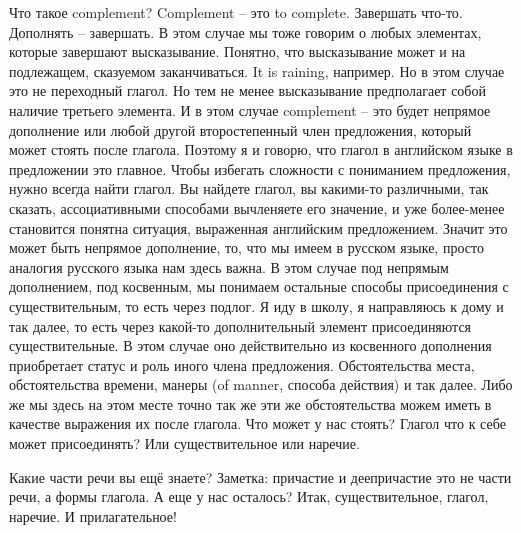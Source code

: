 \documentclass[main.tex]{subfiles}
\begin{document}
Что такое complement?
Complement -- это to complete.
Завершать что-то.
Дополнять -- завершать.
В этом случае мы тоже говорим о любых элементах, которые завершают высказывание.
Понятно, что высказывание может и на подлежащем, сказуемом заканчиваться.
It is raining, например.
Но в этом случае это не переходный глагол.
Но тем не менее высказывание предполагает собой наличие третьего элемента.
И в этом случае complement -- это будет непрямое дополнение или любой другой второстепенный член предложения, который может стоять после глагола.
Поэтому я и говорю, что глагол в английском языке в предложении это главное.
Чтобы избегать сложности с пониманием предложения, нужно всегда найти глагол.
Вы найдете глагол, вы какими-то различными, так сказать, ассоциативными способами вычленяете его значение, и уже более-менее становится понятна ситуация, выраженная английским предложением.
Значит это может быть непрямое дополнение, то, что мы имеем в русском языке, просто аналогия русского языка нам здесь важна.
В этом случае под непрямым дополнением, под косвенным, мы понимаем остальные способы присоединения с существительным, то есть через подлог.
Я иду в школу, я направляюсь к дому и так далее, то есть через какой-то дополнительный элемент присоединяются существительные.
В этом случае оно действительно из косвенного дополнения приобретает статус и роль иного члена предложения.
Обстоятельства места, обстоятельства времени, манеры (of manner, способа действия) и так далее.
Либо же мы здесь на этом месте точно так же эти же обстоятельства можем иметь в качестве выражения их после глагола.
Что может у нас стоять?
Глагол что к себе может присоединять?
Или существительное или наречие.

Какие части речи вы ещё знаете?
Заметка: причастие и деепричастие это не части речи, а формы глагола.
А еще у нас осталось?
Итак, существительное, глагол, наречие. И прилагательное!
\end{document}
